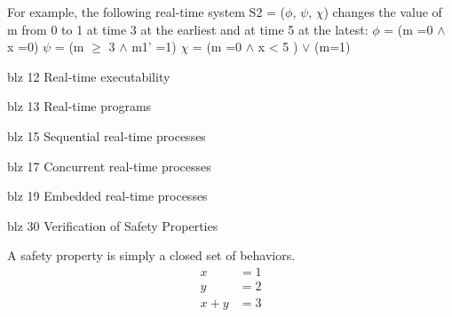 For example, the following real-time system S2 = ($\phi$, $\psi$, $\chi$)
changes the value of m from 0 to 1 at time 3 at the earliest and at time 5 at the
latest:
$\phi$ = (m =0 $\wedge$ x =0)
$\psi$ = (m $\geq$ 3 $\wedge$ m1' =1)
$\chi$ = (m =0 $\wedge$ x < 5 ) $\vee$ (m=1)

blz 12 Real-time executability

blz 13 Real-time programs

blz 15 Sequential real-time processes


blz 17 Concurrent real-time processes


blz 19 Embedded real-time processes

blz 30 Verification of Safety Properties

A safety property is simply a closed set of behaviors.
\begin{equation*}
	\begin{split}
		x &= 1 \\
		y &= 2 \\
		\hline
		x + y &= 3 
	\end{split}
\end{equation*}





